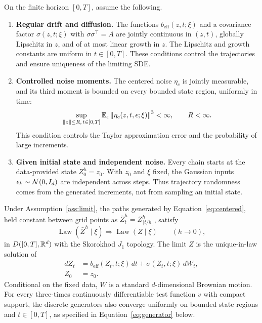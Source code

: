 \begin{assumption}\label{ass:limit}
On the finite horizon $[0,T]$, assume the following.
\begin{enumerate}
\item \textnormal{\bfseries Regular drift and diffusion.}\label{ass:limit-regularity}
The functions $b_{\mathrm{eff}}(z,t;\xi)$ and a covariance factor $\sigma(z,t;\xi)$ with $\sigma\sigma^\top=A$ are jointly continuous in $(z,t)$, globally Lipschitz in $z$, and of at most linear growth in $z$. The Lipschitz and growth constants are uniform in $t\in[0,T]$. These conditions control the trajectories and ensure uniqueness of the limiting SDE.
\item \textnormal{\bfseries Controlled noise moments.}\label{ass:limit-moments}
The centered noise $\eta_c$ is jointly measurable, and its third moment is bounded on every bounded state region, uniformly in time:
\begin{equation}\label{eq:local-third-assumption}
 \sup_{\left\lVert z\right\rVert\leq R,\,t\in[0,T]}
 \mathbb E_\epsilon\left\lVert \eta_c(z,t,\epsilon;\xi)\right\rVert^3<\infty,
 \qquad R<\infty.
\end{equation}
This condition controls the Taylor approximation error and the probability of large increments.
\item \textnormal{\bfseries Given initial state and independent noise.}\label{ass:limit-initial}
Every chain starts at the data-provided state $Z_0^h=z_0$. With $z_0$ and $\xi$ fixed, the Gaussian inputs $\epsilon_k\sim\mathcal N(0,I_d)$ are independent across steps. Thus trajectory randomness comes from the generated increments, not from sampling an initial state.
\end{enumerate}
\end{assumption}

\begin{theorem}\label{thm:weak}
Under Assumption~\ref{ass:limit}, the paths generated by Equation~\eqref{eq:centered}, held constant between grid points as $\bar Z^h_t=Z^h_{\lfloor t/h\rfloor}$, satisfy
\[
 \operatorname{Law}(\bar Z^h\mid\xi)
 \Longrightarrow\operatorname{Law}(Z\mid\xi)
 \qquad(h\to0),
\]
in $D([0,T],\mathbb R^d)$ with the Skorokhod $J_1$ topology. The limit $Z$ is the unique-in-law solution of
\begin{equation}\label{eq:limit}
 \begin{aligned}
 dZ_t&=b_{\mathrm{eff}}(Z_t,t;\xi)\,dt+\sigma(Z_t,t;\xi)\,dW_t,\\
 Z_0&=z_0.
 \end{aligned}
\end{equation}
Conditional on the fixed data, $W$ is a standard $d$-dimensional Brownian motion. For every three-times continuously differentiable test function $v$ with compact support, the discrete generators also converge uniformly on bounded state regions and $t\in[0,T]$, as specified in Equation~\eqref{eq:generator} below.
\end{theorem}

